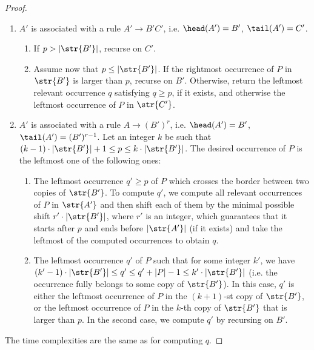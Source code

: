 \begin{proof}
\begin{enumerate}
\item $A'$ is associated with a rule $A' \rightarrow B'C'$, i.e. $\head(A') = B'$, $\tail(A') = C'$. 
\begin{enumerate}
\item If $p > |\str{B'}|$, recurse on $C'$. 
\item Assume now that $p \leq |\str{B'}|$. If the rightmost  occurrence of $P$ in $\str{B'}$ is larger than $p$, recurse on $B'$. Otherwise, return the leftmost relevant occurrence $q$ satisfying $q\geq p$, if it exists, and otherwise the leftmost occurrence of $P$ in $\str{C'}$. %
\end{enumerate}
\item $A'$ is associated with a rule $A \rightarrow (B')^r$, i.e. $\head(A') = B'$, $\tail(A') = (B')^{r-1}$.  Let an integer $k$ be such that $(k-1) \cdot |\str{B'}|+1 \le p \le k \cdot |\str{B'}|$. The desired occurrence of $P$ is the leftmost one of the following ones:
\begin{enumerate}
    \item The leftmost occurrence $q' \geq p$ of $P$ which crosses the border between two copies of $\str{B'}$. To compute $q'$, we compute all relevant occurrences of $P$ in $\str{A'}$ and then shift each of them by the minimal possible shift $r' \cdot |\str{B'}|$, where $r'$ is an integer, which guarantees that it starts after $p$ and ends before $|\str{A'}|$ (if it exists) and take the leftmost of the computed occurrences to obtain $q$.
    \item The leftmost occurrence $q'$ of $P$ such that for some integer $k'$, we have $(k'-1) \cdot |\str{B'}| \le q' \le q'+|P|-1 \le k' \cdot |\str{B'}|$ (i.e. the occurrence fully belongs to some copy of $\str{B'}$). In this case, $q'$ is either the leftmost occurrence of $P$ in the $(k+1)$-st copy of $\str{B'}$, or the leftmost occurrence of $P$ in the $k$-th copy of $\str{B'}$ that is larger than $p$. In the second case, we compute $q'$ by recursing on $B'$.
    \end{enumerate}
\end{enumerate}
The time complexities are the same as for computing $q$.
\end{proof}

